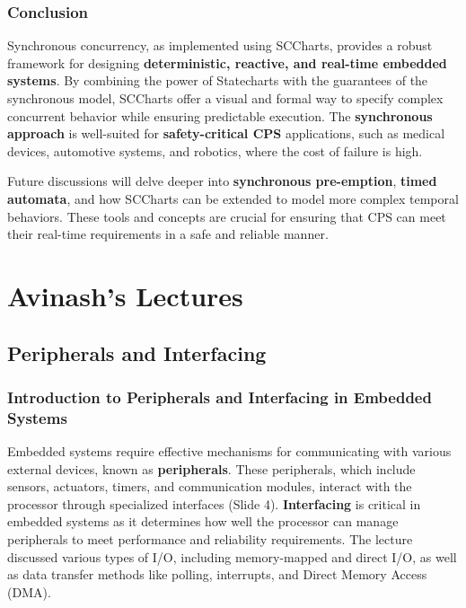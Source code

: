 \documentclass[
  14pt,
  a4paper,
  numbers=noendperiod,
  headinclude=true,
  footinclude=true,
  DIV=calc]{scrreprt}
\begin{document}
\section{Conclusion}\label{conclusion-1}

Synchronous concurrency, as implemented using SCCharts, provides a
robust framework for designing \textbf{deterministic, reactive, and
real-time embedded systems}. By combining the power of Statecharts with
the guarantees of the synchronous model, SCCharts offer a visual and
formal way to specify complex concurrent behavior while ensuring
predictable execution. The \textbf{synchronous approach} is well-suited
for \textbf{safety-critical CPS} applications, such as medical devices,
automotive systems, and robotics, where the cost of failure is high.

Future discussions will delve deeper into \textbf{synchronous
pre-emption}, \textbf{timed automata}, and how SCCharts can be extended
to model more complex temporal behaviors. These tools and concepts are
crucial for ensuring that CPS can meet their real-time requirements in a
safe and reliable manner.

\part{Avinash's Lectures}

\chapter{Peripherals and Interfacing}\label{peripherals-and-interfacing}

\section{Introduction to Peripherals and Interfacing in Embedded
Systems}\label{introduction-to-peripherals-and-interfacing-in-embedded-systems}

Embedded systems require effective mechanisms for communicating with
various external devices, known as \textbf{peripherals}. These
peripherals, which include sensors, actuators, timers, and communication
modules, interact with the processor through specialized interfaces
(Slide 4). \textbf{Interfacing} is critical in embedded systems as it
determines how well the processor can manage peripherals to meet
performance and reliability requirements. The lecture discussed various
types of I/O, including memory-mapped and direct I/O, as well as data
transfer methods like polling, interrupts, and Direct Memory Access
(DMA).
\end{document}
